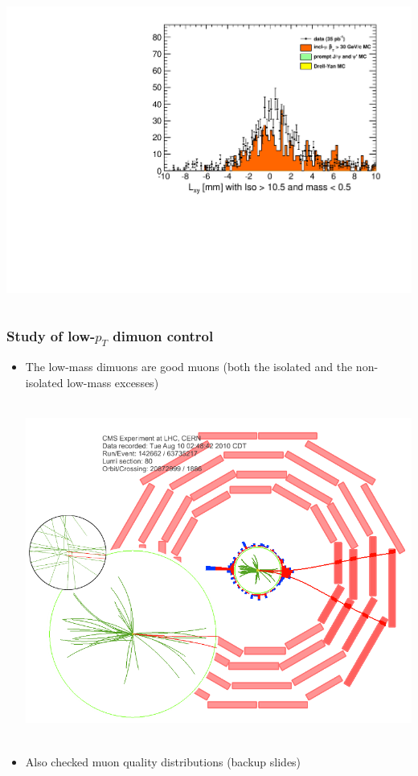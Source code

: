 \documentclass[compress]{beamer}
\begin{document}
\begin{frame}
\begin{columns}
\includegraphics[width=\linewidth]{lowdimuon_lxy_lowmass_noniso.pdf}
\end{columns}
\end{frame}

\begin{frame}
\frametitle{Study of low-$p_T$ dimuon control}
\begin{itemize}
\item The low-mass dimuons are good muons (both the isolated and the
  non-isolated low-mass excesses)

\mbox{ } \hfill \includegraphics[width=0.8\linewidth]{lowmass_example.png} \hfill \mbox{ }

\item Also checked muon quality distributions (backup slides)
\end{itemize}
\end{frame}
\end{document}
